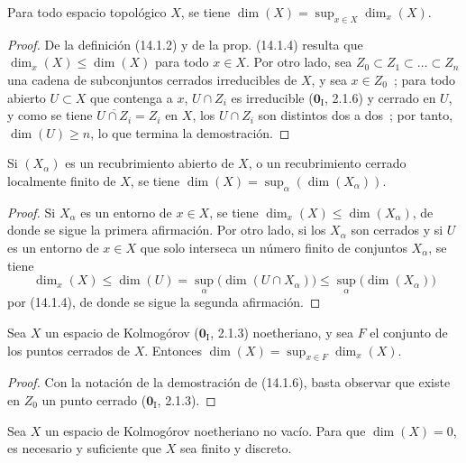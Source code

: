 \begin{proposition}[14.1.6]
\label{0.14.1.6-es}
Para todo espacio topológico $X$, se tiene
$\dim(X)=\sup_{x\in X}\dim_x(X)$.
\end{proposition}

\begin{proof}
De la definición (14.1.2) y de la prop. (14.1.4) resulta que
$\dim_x(X)\leq\dim(X)$ para todo $x\in X$. Por otro lado, sea
$Z_0\subset Z_1\subset\ldots\subset Z_n$ una cadena de subconjuntos cerrados
irreducibles de $X$, y sea $x\in Z_0$~; para todo abierto $U\subset X$
que contenga a $x$, $U\cap Z_i$ es irreducible ($\mathbf{0}_{\mathrm I}$, 2.1.6) y
cerrado en $U$, y como se tiene $\overline{U\cap Z_i}=Z_i$ en $X$, los
$U\cap Z_i$ son distintos dos a dos~; por tanto, $\dim(U)\geq n$, lo que
termina la demostración.
\end{proof}

\begin{corollary}[14.1.7]
\label{0.14.1.7-es}
Si $(X_\alpha)$ es un recubrimiento abierto de $X$, o un recubrimiento cerrado
localmente finito de $X$, se tiene
$\dim(X)=\sup_\alpha(\dim(X_\alpha))$.
\end{corollary}

\begin{proof}
Si $X_\alpha$ es un entorno de $x\in X$, se tiene
$\dim_x(X)\leq\dim(X_\alpha)$, de donde se sigue la primera afirmación. Por otro
lado, si los $X_\alpha$ son cerrados y si $U$ es un entorno de $x\in X$ que
solo interseca un número finito de conjuntos $X_\alpha$, se tiene
\[
  \dim_x(X)\leq\dim(U)=\sup_\alpha\bigl(\dim(U\cap X_\alpha)\bigr)
  \leq\sup_\alpha\bigl(\dim(X_\alpha)\bigr)
\]
por (14.1.4), de donde se sigue la segunda afirmación.
\end{proof}

\begin{corollary}[14.1.8]
\label{0.14.1.8-es}
Sea $X$ un espacio de Kolmogórov \textup{($\mathbf 0_{\mathrm I}$, 2.1.3)} noetheriano, y
sea $F$ el conjunto de los puntos cerrados de $X$. Entonces
$\dim(X)=\sup_{x\in F}\dim_x(X)$.
\end{corollary}

\begin{proof}
Con la notación de la demostración de (14.1.6), basta observar
que existe en $Z_0$ un punto cerrado ($\mathbf{0}_{\mathrm I}$, 2.1.3).
\end{proof}

\begin{proposition}[14.1.9]
\label{0.14.1.9-es}
Sea $X$ un espacio de Kolmogórov noetheriano no vacío. Para que
$\dim(X)=0$, es necesario y suficiente que $X$ sea finito y discreto.
\end{proposition}

